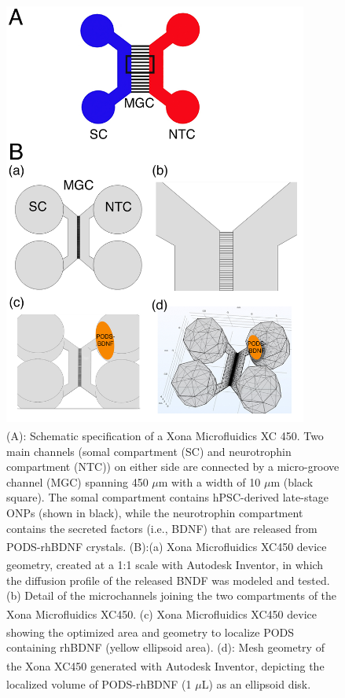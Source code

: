 \documentclass[review]{elsarticle}
\begin{document}
\begin{figure}
	\begin{center}
		\includegraphics[width=10cm]{Fig_3.jpg} %
	\end{center}
	\caption{(A): Schematic specification of a Xona\textsuperscript{\texttrademark} Microfluidics XC 450. Two main channels (somal compartment (SC) and neurotrophin compartment (NTC)) on either side are connected by a micro-groove channel (MGC) spanning 450 $\mu$m with a width of 10 $\mu$m (black square). The somal compartment contains hPSC-derived late-stage ONPs (shown in black), while the neurotrophin compartment contains the secreted factors (i.e., BDNF) that are released from PODS\textsuperscript{\textregistered}-rhBDNF crystals. (B):(a) Xona \textsuperscript{\texttrademark} Microfluidics XC450 device geometry, created at a 1:1 scale with Autodesk Inventor\textsuperscript{\textregistered}, in which the diffusion profile of the released BNDF was modeled and tested. (b) Detail of the microchannels joining the two compartments of the Xona \textsuperscript{\texttrademark} Microfluidics XC450.  (c) Xona \textsuperscript{\texttrademark} Microfluidics XC450 device showing the optimized area and geometry to localize PODS\textsuperscript{\textregistered} containing rhBDNF (yellow ellipsoid area). (d): Mesh geometry of the Xona\textsuperscript{\texttrademark} XC450 generated with Autodesk Inventor, depicting the localized volume of PODS\textsuperscript{\textregistered}-rhBDNF (1 $\mu$L) as an ellipsoid disk.}
\end{figure}
\end{document}
